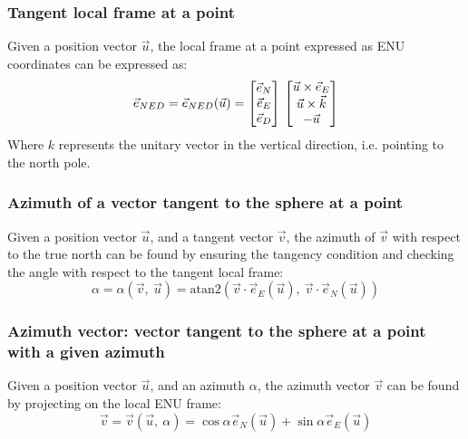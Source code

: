 \subsubsection{Tangent local frame at a point}
Given a position vector $\vec{u}$, the local frame at a point expressed as ENU coordinates can be expressed as:
\begin{equation}
    \vec{e}_{NED} = \vec{e}_{NED} (\vec{u}) =
    \left[
        \begin{matrix}
            \vec{e}_N \\
            \vec{e}_E \\
            \vec{e}_D \\
    \end{matrix}\right] \\
    \left[
        \begin{matrix}            
            \vec{u} \times \vec{e}_E \\
			\vec{u} \times \vec{k} \\
            -\vec{u}
    \end{matrix}\right]
\end{equation}
Where $k$ represents the unitary vector in the vertical direction, i.e. pointing to the north pole.

\subsubsection{Azimuth of a vector tangent to the sphere at a point}
Given a position vector $\vec{u}$, and a tangent vector $\vec{v}$, the azimuth of $\vec{v}$ with respect to the true north can be found by ensuring the tangency condition and checking the angle with respect to the tangent local frame:
\begin{equation}
	\alpha = \alpha (\vec{v}, \ \vec{u}) = \text{atan2} (\vec{v} \cdot \vec{e}_E(\vec{u}), \ \vec{v} \cdot \vec{e}_N(\vec{u}))
\end{equation}

\subsubsection{Azimuth vector: vector tangent to the sphere at a point with a given azimuth}
Given a position vector $\vec{u}$, and an azimuth $\alpha$, the azimuth vector $\vec{v}$ can be found by projecting on the local ENU frame:
\begin{equation}
	\vec{v} = \vec{v} (\vec{u}, \ \alpha) = \cos \alpha \vec{e}_N(\vec{u})  + \sin \alpha \vec{e}_E(\vec{u}) 
\end{equation}

